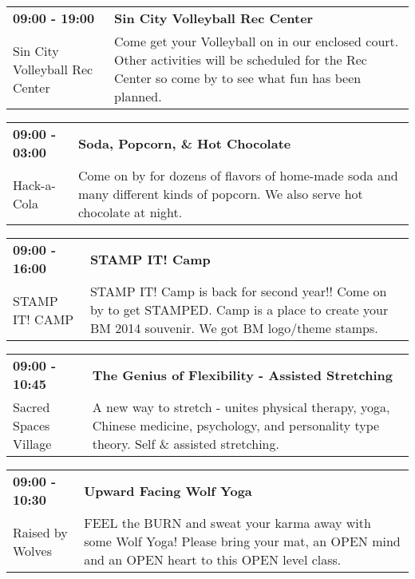 \begin{tabular}{ p{1in} p{2.2in} }
    \textbf{09:00 - 19:00} & \textbf{Sin City Volleyball Rec Center} \\
    Sin City Volleyball Rec Center \newline  & Come get your Volleyball on in our enclosed court. Other activities will be scheduled for the Rec Center so come by to see what fun has been planned. \\
    \hline 
\end{tabular}
    
\begin{tabular}{ p{1in} p{2.2in} }
    \textbf{09:00 - 03:00} & \textbf{Soda, Popcorn, \& Hot Chocolate} \\
    Hack-a-Cola \newline  & Come on by for dozens of flavors of home-made soda and many different kinds of popcorn. We also serve hot chocolate at night. \\
    \hline 
\end{tabular}
    
\begin{tabular}{ p{1in} p{2.2in} }
    \textbf{09:00 - 16:00} & \textbf{STAMP IT! Camp} \\
    STAMP IT! CAMP \newline  & STAMP IT! Camp is back for second year!! Come on by to get STAMPED. Camp is a place to create your BM 2014 souvenir. We got BM logo/theme stamps. \\
    \hline 
\end{tabular}
    
\begin{tabular}{ p{1in} p{2.2in} }
    \textbf{09:00 - 10:45} & \textbf{The Genius of Flexibility - Assisted Stretching} \\
    Sacred Spaces Village \newline  & A new way to stretch - unites physical therapy, yoga, Chinese medicine, psychology, and personality type theory. Self \& assisted stretching. \\
    \hline 
\end{tabular}
    
\begin{tabular}{ p{1in} p{2.2in} }
    \textbf{09:00 - 10:30} & \textbf{Upward Facing Wolf Yoga} \\
    Raised by Wolves \newline  & FEEL the BURN and sweat your karma away with some Wolf Yoga! Please bring your mat, an OPEN mind and an OPEN heart to this OPEN level class. \\
    \hline 
\end{tabular}
    
